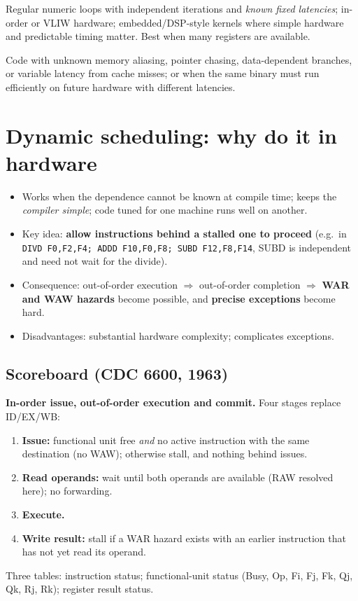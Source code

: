 \begin{pick}
Regular numeric loops with independent iterations and \emph{known fixed latencies}; in-order or VLIW hardware; embedded/DSP-style kernels where simple hardware and predictable timing matter. Best when many registers are available.
\end{pick}
\begin{avoid}
Code with unknown memory aliasing, pointer chasing, data-dependent branches, or variable latency from cache misses; or when the same binary must run efficiently on future hardware with different latencies.
\end{avoid}
\bigskip
{}

\section{Dynamic scheduling: why do it in hardware}
\begin{itemize}
\item Works when the dependence cannot be known at compile time; keeps the \emph{compiler simple}; code tuned for one machine runs well on another.
\item Key idea: \textbf{allow instructions behind a stalled one to proceed} (e.g.\ in \texttt{DIVD F0,F2,F4; ADDD F10,F0,F8; SUBD F12,F8,F14}, SUBD is independent and need not wait for the divide).
\item Consequence: out-of-order execution $\Rightarrow$ out-of-order completion $\Rightarrow$ \textbf{WAR and WAW hazards} become possible, and \textbf{precise exceptions} become hard.
\item Disadvantages: substantial hardware complexity; complicates exceptions.
\end{itemize}

\subsection{Scoreboard (CDC 6600, 1963)}
\textbf{In-order issue, out-of-order execution and commit.} Four stages replace ID/EX/WB:
\begin{enumerate}
\item \textbf{Issue:} functional unit free \emph{and} no active instruction with the same destination (no WAW); otherwise stall, and nothing behind issues.
\item \textbf{Read operands:} wait until both operands are available (RAW resolved here); no forwarding.
\item \textbf{Execute.}
\item \textbf{Write result:} stall if a WAR hazard exists with an earlier instruction that has not yet read its operand.
\end{enumerate}
Three tables: instruction status; functional-unit status (Busy, Op, Fi, Fj, Fk, Qj, Qk, Rj, Rk); register result status.


